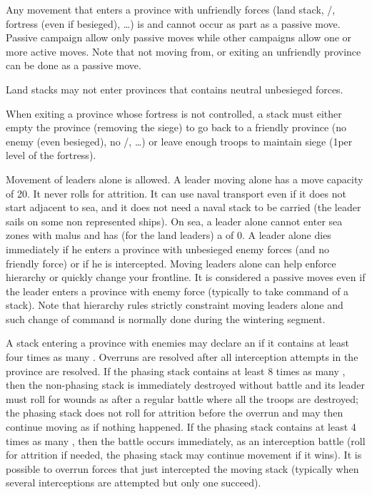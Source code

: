 Any movement that enters a province with unfriendly forces (land stack,
\REVOLT/\REBELLION, fortress (even if besieged), \ldots) is  and
cannot occur as part as a passive move. Passive campaign allow only passive
moves while other campaigns allow one or more active moves. Note that not
moving from, or exiting an unfriendly province can be done as a passive move.

Land stacks may not enter provinces that contains neutral unbesieged forces.

When exiting a province whose fortress is not controlled, a stack must either
empty the province (removing the siege) to go back to a friendly province (no
enemy (even besieged), no \REVOLT/\REBELLION, \ldots) or leave enough troops
to maintain siege (1\LD per level of the fortress).

Movement of leaders alone is allowed. A leader moving alone has a move
capacity of 20\MP. It never rolls for attrition. It can use naval transport
even if it does not start adjacent to sea, and it does not need a naval stack
to be carried (the leader sails on some non represented ships). On sea, a
leader alone cannot enter sea zones with malus and has (for the land leaders)
a \Man of 0. A leader alone dies immediately if he enters a province with
unbesieged enemy forces (and no friendly force) or if he is
intercepted. Moving leaders alone can help enforce hierarchy or quickly change
your frontline. It is considered a passive moves even if the leader enters a
province with enemy force (typically to take command of a stack). Note that
hierarchy rules strictly constraint moving leaders alone and such change of
command is normally done during the wintering segment.

A stack entering a province with enemies may declare an  if it
contains at least four times as many \LD. Overruns are resolved after all
interception attempts in the province are resolved. If the phasing stack
contains at least 8 times as many \LD, then the non-phasing stack is
immediately destroyed without battle and its leader must roll for wounds as
after a regular battle where all the troops are destroyed; the phasing stack
does not roll for attrition before the overrun and may then continue moving as
if nothing happened. If the phasing stack contains at least 4 times as many
\LD, then the battle occurs immediately, as an interception battle (roll for
attrition if needed, the phasing stack may continue movement if it wins). It
is possible to overrun forces that just intercepted the moving stack
(typically when several interceptions are attempted but only one succeed).

